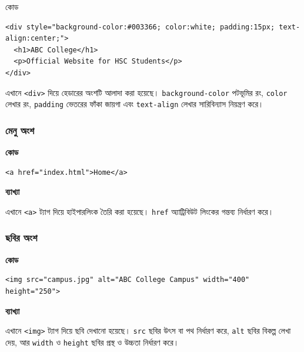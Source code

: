 \begin{examplebox}{কোড}
\begin{verbatim}
<div style="background-color:#003366; color:white; padding:15px; text-align:center;">
  <h1>ABC College</h1>
  <p>Official Website for HSC Students</p>
</div>
\end{verbatim}
\end{examplebox}

এখানে \texttt{<div>} দিয়ে হেডারের অংশটি আলাদা করা হয়েছে। \texttt{background-color} পটভূমির রং, \texttt{color} লেখার রং, \texttt{padding} ভেতরের ফাঁকা জায়গা এবং \texttt{text-align} লেখার সারিবিন্যাস নিয়ন্ত্রণ করে।

\subsubsection{মেনু অংশ}

\par\noindent
\begin{minipage}[t]{.50\linewidth}\vspace{0pt}\small
\textbf{\color{chFourTeal}কোড}\par
\begin{verbatim}
<a href="index.html">Home</a>
\end{verbatim}
\par\smallskip
\end{minipage}\hfill
\begin{minipage}[t]{.46\linewidth}\vspace{0pt}\small
\textbf{\color{chFourTeal}ব্যাখ্যা}\par
এখানে \texttt{<a>} ট্যাগ দিয়ে হাইপারলিংক তৈরি করা হয়েছে। \texttt{href} অ্যাট্রিবিউট লিংকের গন্তব্য নির্ধারণ করে।
\end{minipage}\par
\subsubsection{ছবির অংশ}

\par\noindent
\begin{minipage}[t]{.54\linewidth}\vspace{0pt}\small
\textbf{\color{chFourTeal}কোড}\par
\begin{verbatim}
<img src="campus.jpg" alt="ABC College Campus" width="400" height="250">
\end{verbatim}
\par\smallskip
\end{minipage}\hfill
\begin{minipage}[t]{.42\linewidth}\vspace{0pt}\small
\textbf{\color{chFourTeal}ব্যাখ্যা}\par
এখানে \texttt{<img>} ট্যাগ দিয়ে ছবি দেখানো হয়েছে। \texttt{src} ছবির উৎস বা পথ নির্ধারণ করে, \texttt{alt} ছবির বিকল্প লেখা দেয়, আর \texttt{width} ও \texttt{height} ছবির প্রস্থ ও উচ্চতা নির্ধারণ করে।
\end{minipage}\par
